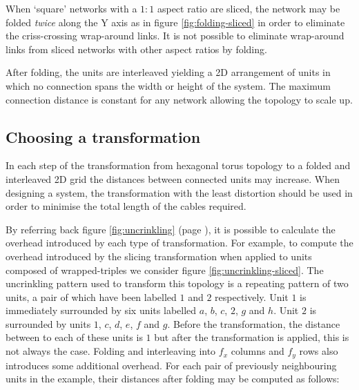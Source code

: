 			When `square' networks with a $1:1$ aspect ratio are sliced, the network
			may be folded \emph{twice} along the Y axis as in figure
			\ref{fig:folding-sliced} in order to eliminate the criss-crossing
			wrap-around links. It is not possible to eliminate wrap-around links from
			sliced networks with other aspect ratios by folding.
			
			After folding, the units are interleaved yielding a 2D arrangement of
			units in which no connection spans the width or height of the system. The
			maximum connection distance is constant for any network allowing the
			topology to scale up.
		
		\subsection{Choosing a transformation}
			
			\label{sec:distortion}
			
			In each step of the transformation from hexagonal torus topology to a
			folded and interleaved 2D grid the distances between connected units may
			increase. When designing a system, the transformation with the least
			distortion should be used in order to minimise the total length of the
			cables required.
			
			By referring back figure \ref{fig:uncrinkling} (page
			\pageref{fig:uncrinkling}), it is possible to calculate the overhead
			introduced by each type of transformation.  For example, to compute the
			overhead introduced by the slicing transformation when applied to units
			composed of wrapped-triples we consider figure
			\ref{fig:uncrinkling-sliced}. The uncrinkling pattern used to transform
			this topology is a repeating pattern of two units, a pair of which have
			been labelled $1$ and $2$ respectively. Unit $1$ is immediately
			surrounded by six units labelled $a$, $b$, $c$, $2$, $g$ and $h$. Unit
			$2$ is surrounded by units $1$, $c$, $d$, $e$, $f$ and $g$. Before the
			transformation, the distance between to each of these units is $1$ but
			after the transformation is applied, this is not always the case. Folding
			and interleaving into $f_x$ columns and $f_y$ rows also introduces some
			additional overhead. For each pair of previously neighbouring units in
			the example, their distances after folding may be computed as follows:
			
